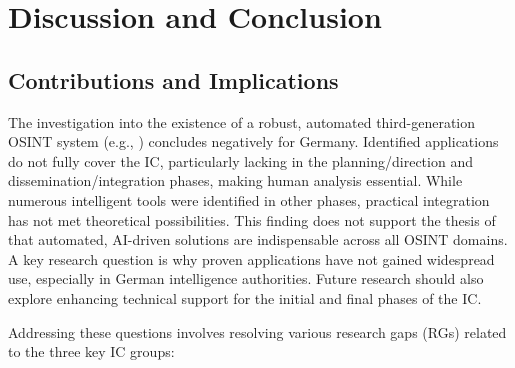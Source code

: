 \documentclass[10pt]{article}
\begin{document}
\section{Discussion and Conclusion} \label{sec:discussion}
\subsection{Contributions and Implications}

The investigation into the existence of a robust, automated third-generation OSINT system (e.g., \cite{Ghioni.2023}) concludes negatively for Germany. Identified applications do not fully cover the IC, particularly lacking in the planning/direction and dissemination/integration phases, making human analysis essential. While numerous intelligent tools were identified in other phases, practical integration has not met theoretical possibilities. This finding does not support the thesis of \textcite{Yogish.2021} that automated, AI-driven solutions are indispensable across all OSINT domains. A key research question is why proven applications have not gained widespread use, especially in German intelligence authorities. Future research should also explore enhancing technical support for the initial and final phases of the IC.

Addressing these questions involves resolving various research gaps (RGs) related to the three key IC groups:
\end{document}
